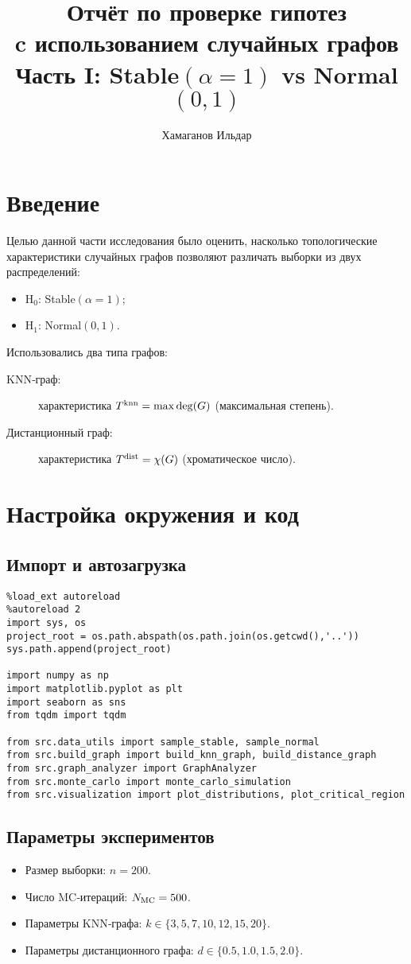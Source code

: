 \documentclass[12pt,a4paper]{article}
\title{Отчёт по проверке гипотез \\ c использованием случайных графов \\ \small Часть I: Stable$(\alpha=1)$ vs Normal$(0,1)$}
\author{Хамаганов Ильдар \\}
\date{}
\begin{document}
\maketitle

\section*{Введение}
Целью данной части исследования было оценить, насколько топологические характеристики случайных графов позволяют различать выборки из двух распределений:
\begin{itemize}
  \item H$_0$: Stable$(\alpha=1)$;
  \item H$_1$: Normal$(0,1)$.
\end{itemize}
Использовались два типа графов:
\begin{description}
  \item[KNN‑граф:] характеристика $T^{\rm knn} = \max\deg(G)$ (максимальная степень).
  \item[Дистанционный граф:] характеристика $T^{\rm dist} = \chi(G)$ (хроматическое число).
\end{description}

\section{Настройка окружения и код}
\subsection*{Импорт и автозагрузка}
\begin{verbatim}
%load_ext autoreload
%autoreload 2
import sys, os
project_root = os.path.abspath(os.path.join(os.getcwd(),'..'))
sys.path.append(project_root)

import numpy as np
import matplotlib.pyplot as plt
import seaborn as sns
from tqdm import tqdm

from src.data_utils import sample_stable, sample_normal
from src.build_graph import build_knn_graph, build_distance_graph
from src.graph_analyzer import GraphAnalyzer
from src.monte_carlo import monte_carlo_simulation
from src.visualization import plot_distributions, plot_critical_region
\end{verbatim}

\subsection*{Параметры экспериментов}
\begin{itemize}
  \item Размер выборки: $n=200$.
  \item Число MC‑итераций: $N_{\rm MC}=500$.
  \item Параметры KNN‑графа: $k\in\{3,5,7,10,12,15,20\}$.
  \item Параметры дистанционного графа: $d\in\{0.5,1.0,1.5,2.0\}$.
\end{itemize}
\end{document}
